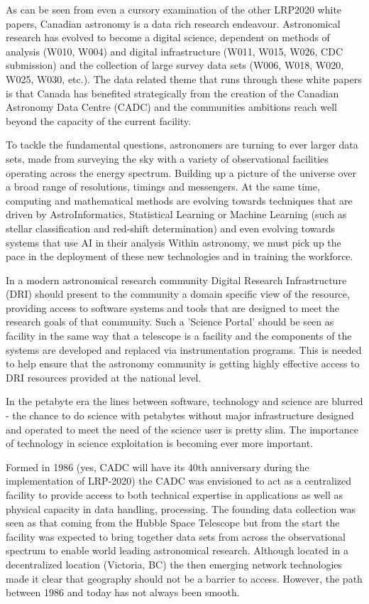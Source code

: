 \documentclass[11pt]{article}
\begin{document}
As can be seen from even a cursory examination of the other LRP2020 white papers, Canadian astronomy is a data rich research endeavour.  Astronomical research has evolved to become a digital science, dependent on methods of analysis (W010, W004) and digital infrastructure (W011, W015, W026, CDC submission) and the collection of large survey data sets (W006, W018, W020, W025, W030, etc.).  The data related theme that runs through these white papers is that Canada has benefited strategically from the creation of the Canadian Astronomy Data Centre (CADC) and the communities ambitions reach well beyond the capacity of the current facility. 

To tackle the fundamental questions, astronomers are turning to ever larger data sets, made from surveying the sky with a variety of observational facilities operating across the energy spectrum. Building up a picture of the universe over a broad range of resolutions, timings and messengers.  At the same time, computing and mathematical methods are evolving towards techniques that are driven by AstroInformatics, Statistical Learning or Machine Learning (such as stellar classification and red-shift determination) and even evolving towards systems that use AI in their analysis  Within astronomy, we must pick up the pace in the deployment of these new technologies and in training the workforce.

In a modern astronomical research community Digital Research Infrastructure (DRI) should present to the community a domain specific view of the resource, providing access to software systems and tools that are designed to meet the research goals of that community.  Such a 'Science Portal' should be seen as facility in the same way that a telescope is a facility and the components of the systems are developed and replaced via instrumentation programs.  This is needed to help ensure that the astronomy community is getting highly effective access to DRI resources provided at the national level.

In the petabyte era the lines between software, technology and science are blurred - the chance to do science with petabytes without major infrastructure designed and operated to meet the need of the science user is pretty slim.  The importance of technology in science exploitation is becoming ever more important.

Formed in 1986 (yes, CADC will have its 40th anniversary during the implementation of LRP-2020) the CADC was envisioned to act as a centralized facility to provide access to both technical expertise in applications as well as physical capacity in data handling, processing. The founding data collection was seen as that coming from the Hubble Space Telescope but from the start the facility was expected to bring together data sets from across the observational spectrum to enable world leading astronomical research. Although located in a decentralized location (Victoria, BC) the then emerging network technologies made it clear that geography should not be a barrier to access.  However, the path between 1986 and today has not always been smooth.
\end{document}
